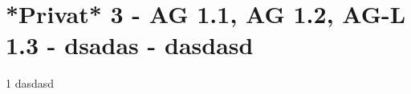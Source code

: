 \section{*Privat* 3 - AG 1.1, AG 1.2, AG-L 1.3 - dsadas - dasdasd}

\begin{langesbeispiel} \item[1] %
dasdasd

\end{langesbeispiel}